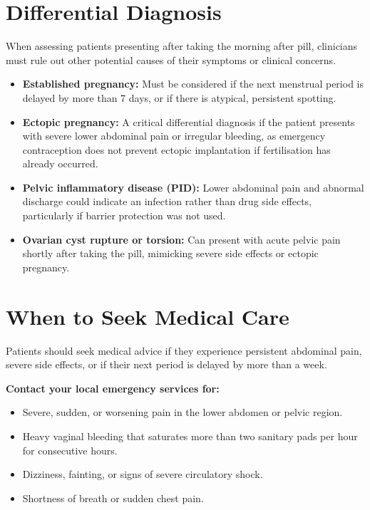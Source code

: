 \section*{Differential Diagnosis}
When assessing patients presenting after taking the morning after pill, clinicians must rule out other potential causes of their symptoms or clinical concerns.
\begin{itemize}
    \item \textbf{Established pregnancy:} Must be considered if the next menstrual period is delayed by more than 7 days, or if there is atypical, persistent spotting.
    \item \textbf{Ectopic pregnancy:} A critical differential diagnosis if the patient presents with severe lower abdominal pain or irregular bleeding, as emergency contraception does not prevent ectopic implantation if fertilisation has already occurred.
    \item \textbf{Pelvic inflammatory disease (PID):} Lower abdominal pain and abnormal discharge could indicate an infection rather than drug side effects, particularly if barrier protection was not used.
    \item \textbf{Ovarian cyst rupture or torsion:} Can present with acute pelvic pain shortly after taking the pill, mimicking severe side effects or ectopic pregnancy.
\end{itemize}

\section*{When to Seek Medical Care}
Patients should seek medical advice if they experience persistent abdominal pain, severe side effects, or if their next period is delayed by more than a week.

\textbf{Contact your local emergency services for:}
\begin{itemize}
    \item Severe, sudden, or worsening pain in the lower abdomen or pelvic region.
    \item Heavy vaginal bleeding that saturates more than two sanitary pads per hour for consecutive hours.
    \item Dizziness, fainting, or signs of severe circulatory shock.
    \item Shortness of breath or sudden chest pain.
\end{itemize}


